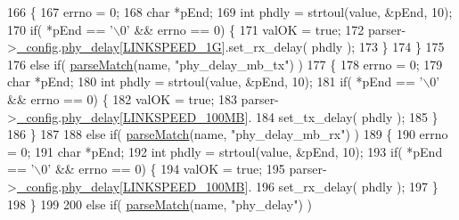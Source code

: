 \begin{DoxyCode}
166         \{
167             errno = 0;
168             \textcolor{keywordtype}{char} *pEnd;
169             \textcolor{keywordtype}{int} phdly = strtoul(value, &pEnd, 10);
170             \textcolor{keywordflow}{if}( *pEnd == \textcolor{charliteral}{'\(\backslash\)0'} && errno == 0) \{
171                 valOK = \textcolor{keyword}{true};
172                 parser->\hyperlink{class_gptp_ini_parser_a8733e97ddaee116e34a67d3e222e45c9}{\_config}.\hyperlink{struct_gptp_ini_parser_1_1gptp__cfg__t_afdea28a656b2ebb14b4bb2354f9d7601}{phy\_delay}[\hyperlink{gptp__cfg_8hpp_a42bd5d531a29e5c8a1be5ded1cf27cb3}{LINKSPEED\_1G}].set\_rx\_delay( phdly );
173             \}
174         \}
175 
176         \textcolor{keywordflow}{else} \textcolor{keywordflow}{if}( \hyperlink{class_gptp_ini_parser_a8465186d2562a5e0c599175104b214ad}{parseMatch}(name, \textcolor{stringliteral}{"phy\_delay\_mb\_tx"}) )
177         \{
178             errno = 0;
179             \textcolor{keywordtype}{char} *pEnd;
180             \textcolor{keywordtype}{int} phdly = strtoul(value, &pEnd, 10);
181             \textcolor{keywordflow}{if}( *pEnd == \textcolor{charliteral}{'\(\backslash\)0'} && errno == 0) \{
182                 valOK = \textcolor{keyword}{true};
183                 parser->\hyperlink{class_gptp_ini_parser_a8733e97ddaee116e34a67d3e222e45c9}{\_config}.\hyperlink{struct_gptp_ini_parser_1_1gptp__cfg__t_afdea28a656b2ebb14b4bb2354f9d7601}{phy\_delay}[\hyperlink{gptp__cfg_8hpp_ad245f9b93c7c5e8f4f5dcde5abae05f2}{LINKSPEED\_100MB}].
184             set\_tx\_delay( phdly );
185             \}
186         \}
187 
188         \textcolor{keywordflow}{else} \textcolor{keywordflow}{if}( \hyperlink{class_gptp_ini_parser_a8465186d2562a5e0c599175104b214ad}{parseMatch}(name, \textcolor{stringliteral}{"phy\_delay\_mb\_rx"}) )
189         \{
190             errno = 0;
191             \textcolor{keywordtype}{char} *pEnd;
192             \textcolor{keywordtype}{int} phdly = strtoul(value, &pEnd, 10);
193             \textcolor{keywordflow}{if}( *pEnd == \textcolor{charliteral}{'\(\backslash\)0'} && errno == 0) \{
194                 valOK = \textcolor{keyword}{true};
195                 parser->\hyperlink{class_gptp_ini_parser_a8733e97ddaee116e34a67d3e222e45c9}{\_config}.\hyperlink{struct_gptp_ini_parser_1_1gptp__cfg__t_afdea28a656b2ebb14b4bb2354f9d7601}{phy\_delay}[\hyperlink{gptp__cfg_8hpp_ad245f9b93c7c5e8f4f5dcde5abae05f2}{LINKSPEED\_100MB}].
196             set\_rx\_delay( phdly );
197             \}
198         \}
199 
200         \textcolor{keywordflow}{else} \textcolor{keywordflow}{if}( \hyperlink{class_gptp_ini_parser_a8465186d2562a5e0c599175104b214ad}{parseMatch}(name, \textcolor{stringliteral}{"phy\_delay"}) )

\end{DoxyCode}
